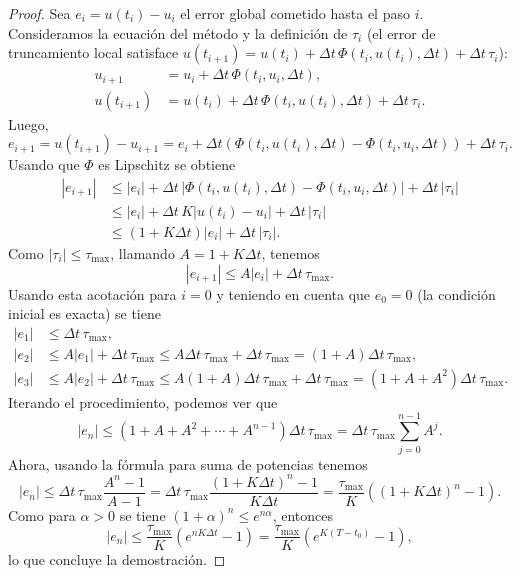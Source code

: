 \documentclass[a4paper,11pt]{report}
\begin{document}
\begin{proof}
Sea $e_i = u(t_i) - u_i$ el error global cometido hasta el paso $i$. Consideramos la ecuación del método y la definición de $\tau_i$ (el error de truncamiento local satisface $u(t_{i+1}) = u(t_i) + \Delta t\,\Phi(t_i, u(t_i), \Delta t) + \Delta t\,\tau_i$):
\begin{align*}
u_{i+1} &= u_i + \Delta t\,\Phi(t_i, u_i, \Delta t), \\
u(t_{i+1}) &= u(t_i) + \Delta t\,\Phi(t_i, u(t_i), \Delta t) + \Delta t\,\tau_i.
\end{align*}
Luego,
\[
e_{i+1} = u(t_{i+1}) - u_{i+1} = e_i + \Delta t\left(\Phi(t_i, u(t_i), \Delta t) - \Phi(t_i, u_i, \Delta t)\right) + \Delta t\,\tau_i.
\]
Usando que $\Phi$ es Lipschitz se obtiene
\begin{align*}
|e_{i+1}| &\leq |e_i| + \Delta t\,|\Phi(t_i, u(t_i), \Delta t) - \Phi(t_i, u_i, \Delta t)| + \Delta t\,|\tau_i| \\
&\leq |e_i| + \Delta t\,K|u(t_i) - u_i| + \Delta t\,|\tau_i| \\
&\leq (1 + K\Delta t)|e_i| + \Delta t\,|\tau_i|.
\end{align*}
Como $|\tau_i| \leq \tau_{\max}$, llamando $A = 1 + K\Delta t$, tenemos
\[
|e_{i+1}| \leq A|e_i| + \Delta t\,\tau_{\max}.
\]
Usando esta acotación para $i=0$ y teniendo en cuenta que $e_0 = 0$ (la condición inicial es exacta) se tiene
\begin{align*}
|e_1| &\leq \Delta t\,\tau_{\max}, \\
|e_2| &\leq A|e_1| + \Delta t\,\tau_{\max} \leq A\Delta t\,\tau_{\max} + \Delta t\,\tau_{\max} = (1+A)\Delta t\,\tau_{\max}, \\
|e_3| &\leq A|e_2| + \Delta t\,\tau_{\max} \leq A(1+A)\Delta t\,\tau_{\max} + \Delta t\,\tau_{\max} = (1+A+A^2)\Delta t\,\tau_{\max}.
\end{align*}
Iterando el procedimiento, podemos ver que
\[
|e_n| \leq (1 + A + A^2 + \cdots + A^{n-1})\Delta t\,\tau_{\max} = \Delta t\,\tau_{\max}\sum_{j=0}^{n-1} A^j.
\]
Ahora, usando la fórmula para suma de potencias tenemos
\[
|e_n| \leq \Delta t\,\tau_{\max}\frac{A^n - 1}{A - 1} = \Delta t\,\tau_{\max}\frac{(1+K\Delta t)^n - 1}{K\Delta t} = \frac{\tau_{\max}}{K}\left((1+K\Delta t)^n - 1\right).
\]
Como para $\alpha > 0$ se tiene $(1+\alpha)^n \leq e^{n\alpha}$, entonces
\[
|e_n| \leq \frac{\tau_{\max}}{K}\left(e^{nK\Delta t} - 1\right) = \frac{\tau_{\max}}{K}\left(e^{K(T-t_0)} - 1\right),
\]
lo que concluye la demostración.
\end{proof}
\end{document}
